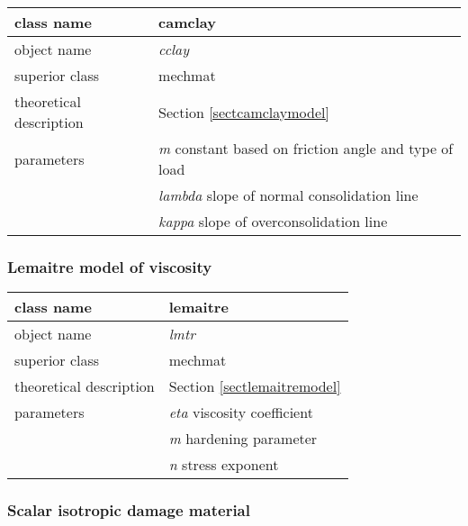 \begin{center}
\begin{tabular}{|l|l|}
\hline
class name & {\sf camclay}\index{class!{\sf camclay}}
\\ \hline
object name & {\it cclay}\index{instance!{\it cclay}}
\\ \hline
superior class & {\sf mechmat}
\\ \hline
theoretical description & Section \ref{sectcamclaymodel}
\\ \hline
parameters & {\it m} constant based on friction angle and type of load
\\
 & {\it lambda} slope of normal consolidation line
\\
 & {\it kappa} slope of overconsolidation line
\\ \hline
\end{tabular}
\end{center}


\subsubsection{Lemaitre model of viscosity}

\begin{center}
\begin{tabular}{|l|l|}
\hline
class name & {\sf lemaitre}\index{class!{\sf lemaitre}}
\\ \hline
object name & {\it lmtr}\index{instance!{\it lmtr}}
\\ \hline
superior class & {\sf mechmat}
\\ \hline
theoretical description & Section \ref{sectlemaitremodel}
\\ \hline
parameters & {\it eta} viscosity coefficient
\\
 & {\it m} hardening parameter
\\
 & {\it n} stress exponent
\\ \hline
\end{tabular}
\end{center}



\subsubsection{Scalar isotropic damage material}

